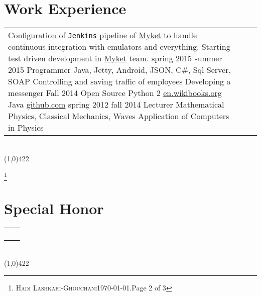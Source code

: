 \documentclass[10pt]{article}
\newcommand{\maxpages}{3}
\newcommand{\maxpages}{3}
\newcommand\HRule{\hspace*{.8cm}\line(1,0){422}\\}
\newenvironment{Record}[1]
{
    \vspace{-0.5cm}
    \section*{#1}
        \vspace{0.1cm}
        \begin{tabular}
}
{
        \end{tabular}\\
        \HRule
}
\newcommand{\FootNote}[1]{\let\thefootnote\relax\footnote{\smallsnellfont{\textbf{\textit{Curriculum Vitae of}}} \textsc{Hadi Lashkari-Ghouchani}\qquad\today.\qquad Page #1 of \maxpages}}
\newcommand\subsectionstyle{\textbf\textsl\subsectionfont}
\newcommand\subsectiondetailstyle{\scriptsize\textit\subsubsectionfont}
\newcommand\subsubsectionstyle{\scriptsize\texttt\subsubsectionfont}
\begin{document}
\begin{Record}{Work Experience}{l l l}
        {Configuration of \scriptsize{\texttt{Jenkins}} pipeline of \href{http://myket.ir}{Myket}}
        {to handle continuous integration with emulators and everything.}
        {Starting test driven development in \href{http://myket.ir}{Myket} team.}%
    \WorkExperience{\href{http://sohasys.ir}{Soha Company}}
        {\subsectiondetailstyle{From} spring 2015}
        {\subsectiondetailstyle{To} summer 2015}
        {Programmer}
        {Java, Jetty, Android, JSON, C\#, Sql Server, SOAP}
        {Controlling and saving traffic of employees}
        {Developing a messenger}
        {}{}%
    \WorkExperience{Persian Calendar}
        {Fall 2014}{}
        {Open Source}
        {Python 2}
        {\href{http://en.wikibooks.org/wiki/Persian_Calendar}{en.wikibooks.org}}
        {Java}
        {\href{https://github.com/hadilq/java-persian-calendar}{github.com}}{}%
    \WorkExperience{\href{http://en.pnu.ac.ir/Portal/Home}{Payame-Noor University}}
        {\subsectiondetailstyle{From} spring 2012}
        {\subsectiondetailstyle{To} fall 2014}
        {Lecturer}
        {Mathematical Physics, Classical Mechanics, Waves}
        {Application of Computers in Physics}
        {}{}{}%
\end{Record}


\FootNote{2}

\newcommand{\SpecialHonor}[3]{
    \subsectionstyle{#1}&\subsubsectionstyle{#2}\\
    &\subsubsectionstyle{#3}\\
}
\begin{Record}{Special Honor}{l l}
    \SpecialHonor{44th rank}
        {\scriptsize Among more than \textbf{five thousand} participants in the \textbf{Nationwide Graduate}}
        {\scriptsize \textbf{Entrance Exam} in Physics and Nanophysics branch at Spring 2007.}%
    \SpecialHonor{First rank}
        {\scriptsize Among all students of Physics group of Payame-Noor University}
        {\scriptsize (50 students).}%
\end{Record}

\end{document}
